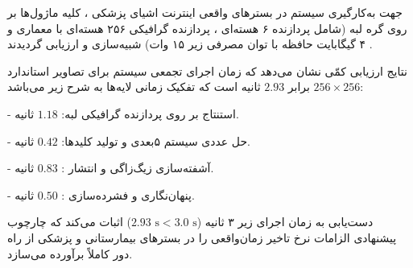 


جهت به‌کارگیری سیستم در بسترهای واقعی اینترنت اشیای پزشکی ، کلیه ماژول‌ها بر روی گره لبه  (شامل پردازنده ۶ هسته‌ای ، پردازنده گرافیکی ۲۵۶ هسته‌ای با معماری  و ۴ گیگابایت حافظه  با توان مصرفی زیر ۱۵ وات) شبیه‌سازی و ارزیابی گردیدند .\par



نتایج ارزیابی کمّی نشان می‌دهد که زمان اجرای تجمعی سیستم برای تصاویر استاندارد $256 \times 256$ برابر $2.93$ ثانیه است که تفکیک زمانی لایه‌ها به شرح زیر می‌باشد:\par

{-} استنتاج  بر روی پردازنده گرافیکی لبه: $1.18$ ثانیه.\par

{-} حل عددی سیستم ۵بعدی و تولید کلیدها: $0.42$ ثانیه.\par

{-} آشفته‌سازی زیگ‌زاگی و انتشار : $0.83$ ثانیه.\par

{-} پنهان‌نگاری  و فشرده‌سازی : $0.50$ ثانیه.\par



دست‌یابی به زمان اجرای زیر ۳ ثانیه ($2.93\text{ s} < 3.0\text{ s}$) اثبات می‌کند که چارچوب پیشنهادی الزامات نرخ تاخیر زمان‌واقعی  را در بسترهای بیمارستانی و پزشکی از راه دور کاملاً برآورده می‌سازد.\par





